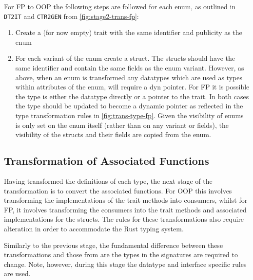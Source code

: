 \documentclass[ oneside,%
                    author={James Elgar},
                    degree={MEng},
                     title={Bidirectional transformer between functional and \\ object-oriented programming in Rust},
                  subtitle={}]{dissertation}
\begin{document}
For FP to OOP the following steps are followed for each enum, as outlined in \verb|DT2IT| and \verb|CTR2GEN| from \autoref{fig:stage2-trans-fp}:
\begin{enumerate}
    \item Create a (for now empty) trait with the same identifier and publicity as the enum  
    \item For each variant of the enum create a struct. The structs should have the same identifier and contain the same fields as the enum variant.
    However, as above, when an enum is transformed any datatypes which are used as types within attributes of the enum, will require a dyn pointer. For FP it is possible the type is either the datatype directly or a pointer to the trait. In both cases the type should be updated to become a dynamic pointer as reflected in the type transformation rules in \autoref{fig:trans-type-fp}.
    Given the visibility of enums is only set on the enum itself (rather than on any variant or fields), the visibility of the structs and their fields are copied from the enum.
\end{enumerate}

\subsection{Transformation of Associated Functions}

Having transformed the definitions of each type, the next stage of the transformation is to convert the associated functions. For OOP this involves transforming the implementations of the trait methods into consumers, whilst for FP, it involves transforming the consumers into the trait methods and associated implementations for the structs. The rules for these transformations also require alteration in order to accommodate the Rust typing system.

Similarly to the previous stage, the fundamental difference between these transformations and those from \cite{food} are the types in the signatures are required to change. Note, however, during this stage the datatype and interface specific rules are used. 
\end{document}
